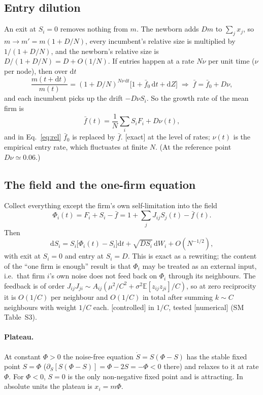 \documentclass[11pt]{article}
\newcommand{\E}{\mathbb E}
\newcommand{\fb}{\bar f}
\newcommand{\dd}{\mathrm d}
\newcommand{\exact}{\textsf{\small[exact]}}
\newcommand{\controlled}{\textsf{\small[controlled]}}
\newcommand{\numer}{\textsf{\small[numerical]}}
\begin{document}
\subsection{Entry dilution}

An exit at $S_i=0$ removes nothing from $m$.  The newborn adds $Dm$ to $\sum_jx_j$, so
$m\to m'=m(1+D/N)$, every incumbent's relative size is multiplied by $1/(1+D/N)$, and the newborn's
relative size is $D/(1+D/N)=D+O(1/N)$.  If entries happen at a rate $N\nu$ per unit time ($\nu$ per
node), then over $\dd t$
\begin{equation}
\frac{m(t+\dd t)}{m(t)}=(1+D/N)^{N\nu\,\dd t}\big[1+\fb_0\,\dd t+\dd Z\big]
\;\Rightarrow\; \fb=\fb_0+D\nu ,
\end{equation}
and each incumbent picks up the drift $-D\nu S_i$.  So the growth rate of the mean firm is
\begin{equation}
\fb(t)=\frac1N\sum_iS_iF_i+D\nu(t),
\label{eq:fbar}
\end{equation}
and in Eq.~\eqref{eq:rel} $\fb_0$ is replaced by $\fb$.  \exact{} at the level of rates; $\nu(t)$ is
the empirical entry rate, which fluctuates at finite $N$.  (At the reference point $D\nu\simeq0.06$.)

\subsection{The field and the one-firm equation}

Collect everything except the firm's own self-limitation into the field
\begin{equation}
\Phi_i(t)=F_i+S_i-\fb=1+\sum_jJ_{ij}S_j(t)-\fb(t).
\label{eq:field}
\end{equation}
Then
\begin{equation}
\boxed{\dd S_i=S_i\big[\Phi_i(t)-S_i\big]\dd t+\sqrt{DS_i}\,\dd W_i+O(N^{-1/2}),}
\label{eq:onefirm}
\end{equation}
with exit at $S_i=0$ and entry at $S_i=D$.  This is exact as a rewriting; the content of the
``one firm is enough'' result is that $\Phi_i$ may be treated as an external input, i.e.\ that firm $i$'s own
noise does not feed back on $\Phi_i$ through its neighbours.  The feedback is of order
$J_{ij}J_{ji}\sim A_{ij}(\mu^2/C^2+\sigma^2\E[z_{ij}z_{ji}]/C)$, so at zero reciprocity it is $O(1/C)$ per
neighbour and $O(1/C)$ in total after summing $k\sim C$ neighbours with weight $1/C$ each.  \controlled{}
in $1/C$, tested \numer{} (SM Table~S3).

\paragraph{Plateau.}  At constant $\Phi>0$ the noise-free equation $\dot S=S(\Phi-S)$ has the stable fixed
point $S=\Phi$ ($\partial_S[S(\Phi-S)]=\Phi-2S=-\Phi<0$ there) and relaxes to it at rate $\Phi$.  For
$\Phi<0$, $S=0$ is the only non-negative fixed point and is attracting.  In absolute units the plateau is
$x_i=m\Phi$.
\end{document}
